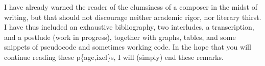 I have already warned the reader of the clumsiness of a composer in the midst of writing, but that should not discourage neither academic rigor, nor literary thirst. I have thus included an exhaustive bibliography, two interludes, a transcription, and a postlude (work in progress), together with graphs, tables, and some snippets of pseudocode and sometimes working code. In the hope that you will continue reading these p\{age,ixel\}s, I will (simply)  end  these remarks.
